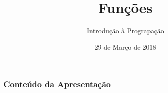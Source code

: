 
\title[PADI-IP]{Funções}

\author{Introdução à Prograpação}
\date{29 de Março de 2018} %



\begin{frame}
\titlepage %
\end{frame}

\begin{frame}
\frametitle{Conteúdo da Apresentação} %
\tableofcontents %
\end{frame}


